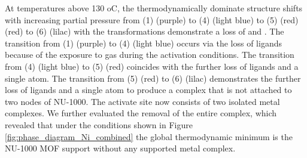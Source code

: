 \documentclass[journal=jctcce,manuscript=article]{achemso}
\begin{document}
At temperatures above 130 oC, the thermodynamically dominate structure shifts with increasing  partial pressure from (1)  (purple) to (4)  (light blue) to (5)  (red) (red) to (6)  (lilac) with the transformations demonstrate a loss of  and . The transition from (1)  (purple) to (4)  (light blue) occurs via the loss of  ligands because of the exposure to  gas during the activation conditions. The transition from (4)  (light blue) to (5)  (red) coincides with the further loss of  ligands and a single  atom. The transition from (5)  (red) to (6)  (lilac) demonstrates the further loss of  ligands and a single  atom to produce a complex that is not attached to two nodes of NU-1000. The activate site now consists of two isolated  metal complexes. We further evaluated the removal of the entire complex, which revealed that under the conditions shown in Figure \ref{fig:phase_diagram_Ni_combined} the global thermodynamic minimum is the NU-1000 MOF support without any  supported metal complex.
\end{document}
